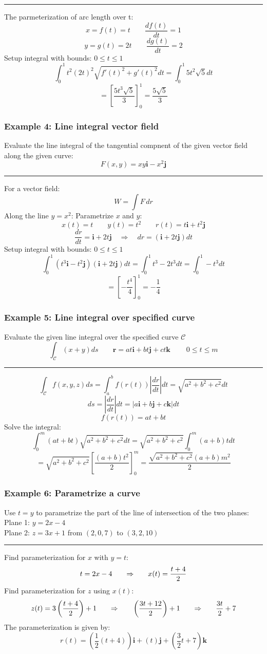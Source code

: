 \rule{\textwidth}{0.5pt}

The parmeterization of arc length over t:
$$x=f(t)=t\qquad \frac{df(t)}{dt}=1$$
$$y=g(t)=2t\qquad \frac{dg(t)}{dt}=2$$
Setup integral with bounds: $0\leq t\leq 1$
$$\int_0^1 t^2(2t)^2\sqrt{f'(t)^2+g'(t)^2}dt=\int_0^1 5t^2\sqrt{5}dt$$
$$=\left[\frac{5t^3\sqrt{5}}{3}\right]^1_0=\frac{5\sqrt{5}}{3}$$

\subsubsection{Example 4: Line integral vector field}
Evaluate the line integral of the tangential compnent of the given vector field along the given curve:
$$F(x,y)=xy\mathbf{i}-x^2\mathbf{j}$$
\rule{\textwidth}{0.5pt}

For a vector field:
$$W=\int F \,dr$$
Along the line $y=x^2$:
Parametrize $x$ and $y$:
$$x(t)=t\qquad y(t)=t^2\qquad r(t)=t\mathbf{i}+t^2\mathbf{j}$$
$$\frac{dr}{dt}=\mathbf{i}+2t\mathbf{j}\quad\Rightarrow\quad dr=(\mathbf{i}+2t\mathbf{j})dt$$
Setup integral with bounds: $0\leq t\leq 1$
$$\int_{0}^{1}(t^3\mathbf{i}-t^2\mathbf{j})(\mathbf{i}+2t\mathbf{j})  dt=\int_0^1t^3-2t^3dt=\int_0^1-t^3dt$$
$$=\left[-\frac{t^4}{4}\right]_0^1=-\frac{1}{4}$$

\subsubsection{Example 5: Line integral over specified curve}
Evaluate the given line integral over the specified curve $\mathcal{C}$
$$\textstyle\int_{\mathcal{C}}(x+y)ds\qquad \mathbf{r}=a t\mathbf{i}+b t\mathbf{j}+c t\mathbf{k}\qquad\ 0\leq t\leq m$$

\rule{\textwidth}{0.5pt}

$$\int_{\mathcal{C}}f(x,y,z)ds=\int_a^bf(r(t))\left|\frac{dr}{dt}\right|dt=\sqrt{a^2+b^2+c^2}dt$$
$$ds=\left|\frac{dr}{dt}\right|dt=|a\mathbf{i}+b\mathbf{j}+c\mathbf{k}|dt$$
$$f(r(t))=at+bt$$
Solve the integral:
$$\int_0^m(at+bt)\sqrt{a^2+b^2+c^2}dt=\sqrt{a^2+b^2+c^2}\int_0^m(a+b)tdt$$
$$=\sqrt{a^2+b^2+c^2}\left[\frac{(a+b)t^2}{2}\right]_0^m=\frac{\sqrt{a^2+b^2+c^2}(a+b)m^2}{2}$$
\subsubsection{Example 6: Parametrize a curve}
Use $t=y$ to parametrize the part of the line of intersection of the two planes:\\
Plane 1: $y=2x-4$\\
Plane 2: $z=3x+1$ from $(2,0,7)$ to $(3,2,10)$

\rule{\textwidth}{0.5pt}

Find parameterization for $x$ with $y=t$:
$$t=2x-4 {\qquad\Rightarrow\qquad} x(t)=\frac{t+4}{2}$$
Find parameterization for $z$ using $x(t)$:
$$z(t)=3\left(\frac{t+4}{2}\right)+1{\qquad\Rightarrow\qquad} \left(\frac{3t+12}{2}\right)+1{\qquad\Rightarrow\qquad} \frac{3t}{2}+7$$
The parameterization is given by:
$$r(t)=\left(\frac{1}{2}(t+4)\right)\mathbf{i}+(t)\mathbf{j}+\left(\frac{3}{2}t+7\right)\mathbf{k}$$
